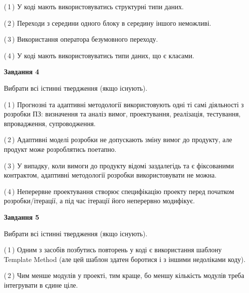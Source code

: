\documentclass[10pt, ukrainian]{article}
\begin{document}
{\begin {large}
(\,1\,) У коді мають використовуватись структурні типи даних. %



(\,2\,) Переходи з середини одного блоку в середину іншого неможливі. %



(\,3\,) Використання оператора безумовного переходу. %



(\,4\,) У коді мають використовуватись типи даних, що є класами. %


{\begin {center}\textbf{Завдання 4}\end {center}}\par
Вибрати всі істинні твердження (якщо існують).\par
\vspace{2mm}



(\,1\,) Прогнозні та адаптивні методології використовують одні ті самі діяльності з розробки ПЗ: визначення та аналіз вимог, проектування, реалізація, тестування, впровадження, супроводження. %



(\,2\,) Адаптивні моделі розробки не допускають зміну вимог до продукту, але продукт може розроблятись поетапно. %



(\,3\,) У випадку, коли вимоги до продукту відомі заздалегідь та є фіксованими контрактом, адаптивні методології розробки використовувати не можна. %



(\,4\,) Неперервне проектування створює специфікацію проекту перед початком розробки/ітерації, а під час ітерації його неперервно модифікує.%


{\begin {center}\textbf{Завдання 5}\end {center}}\par
Вибрати всі істинні твердження (якщо існують).\par
\vspace{2mm}



(\,1\,) Одним з засобів позбутись повторень у коді є використання шаблону Template Method (але цей шаблон здатен боротися і з іншими недоліками коду). %



(\,2\,) Чим менше модулів у проекті, тим краще, бо меншу кількість модулів треба інтегрувати в єдине ціле. %




\end{large}}
\end{document}
